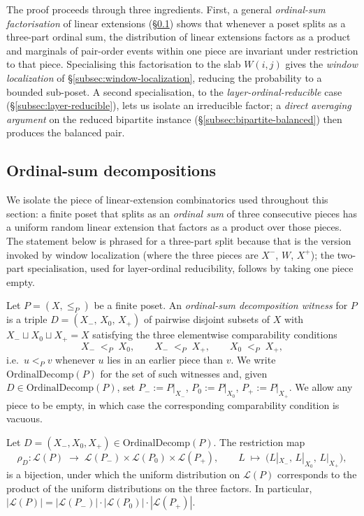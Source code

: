 The proof proceeds through three ingredients. First, a general
\emph{ordinal-sum factorisation} of linear extensions
(\S\ref{subsec:ordinal-decomp}) shows that whenever a poset splits as a
three-part ordinal sum, the distribution of linear extensions factors
as a product and marginals of pair-order events within one piece are
invariant under restriction to that piece. Specialising this
factorisation to the slab $W(i,j)$ gives the \emph{window localization}
of \S\ref{subsec:window-localization}, reducing the probability to a
bounded sub-poset. A second specialisation, to the
\emph{layer-ordinal-reducible} case (\S\ref{subsec:layer-reducible}),
lets us isolate an irreducible factor; a \emph{direct averaging
argument} on the reduced bipartite instance
(\S\ref{subsec:bipartite-balanced}) then produces the balanced pair.

\subsection{Ordinal-sum decompositions}
\label{subsec:ordinal-decomp}

We isolate the piece of linear-extension combinatorics used throughout
this section: a finite poset that splits as an \emph{ordinal sum} of
three consecutive pieces has a uniform random linear extension that
factors as a product over those pieces. The statement below is
phrased for a three-part split because that is the version invoked by
window localization (where the three pieces are $X^-$, $W$, $X^+$);
the two-part specialisation, used for layer-ordinal reducibility,
follows by taking one piece empty.

\begin{definition}
\label{def:ordinal-decomp}
Let $P = (X, \le_P)$ be a finite poset. An \emph{ordinal-sum
decomposition witness} for $P$ is a triple
$D = (X_-,\, X_0,\, X_+)$ of pairwise disjoint subsets of $X$ with
$X_- \sqcup X_0 \sqcup X_+ = X$ satisfying the three elementwise
comparability conditions
\[
  X_- \;<_P\; X_0, \qquad X_- \;<_P\; X_+, \qquad X_0 \;<_P\; X_+,
\]
i.e.\ $u <_P v$ whenever $u$ lies in an earlier piece than $v$. We
write $\mathrm{OrdinalDecomp}(P)$ for the set of such witnesses and,
given $D \in \mathrm{OrdinalDecomp}(P)$, set
$P_- := P|_{X_-}$, $P_0 := P|_{X_0}$, $P_+ := P|_{X_+}$. We allow
any piece to be empty, in which case the corresponding
comparability condition is vacuous.
\end{definition}

\begin{lemma}
\label{lem:ordinal-factorisation}
Let $D = (X_-, X_0, X_+) \in \mathrm{OrdinalDecomp}(P)$. The
restriction map
\[
  \rho_D \colon \mathcal L(P) \;\longrightarrow\;
    \mathcal L(P_-) \times \mathcal L(P_0) \times \mathcal L(P_+),
  \qquad
  L \;\longmapsto\; \bigl(L|_{X_-},\,L|_{X_0},\,L|_{X_+}\bigr),
\]
is a bijection, under which the uniform distribution on $\mathcal
L(P)$ corresponds to the product of the uniform distributions on the
three factors. In particular, $|\mathcal L(P)| = |\mathcal L(P_-)|
\cdot |\mathcal L(P_0)| \cdot |\mathcal L(P_+)|$.
\end{lemma}

